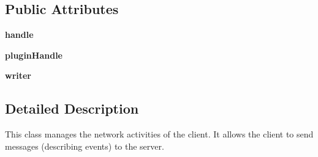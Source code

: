 \subsection*{\-Public \-Attributes}
\begin{DoxyCompactItemize}
\item 
\hypertarget{classshared_1_1network_1_1_network_client_abee0843da70bc52597f451b0844f70c8}{{\bfseries handle}}\label{classshared_1_1network_1_1_network_client_abee0843da70bc52597f451b0844f70c8}

\item 
\hypertarget{classshared_1_1network_1_1_network_client_ab4bb84d37914ba60c1886cedca712655}{{\bfseries plugin\-Handle}}\label{classshared_1_1network_1_1_network_client_ab4bb84d37914ba60c1886cedca712655}

\item 
\hypertarget{classshared_1_1network_1_1_network_client_a642889e1ca4bdd470e4535f7870202e4}{{\bfseries writer}}\label{classshared_1_1network_1_1_network_client_a642889e1ca4bdd470e4535f7870202e4}

\end{DoxyCompactItemize}


\subsection{\-Detailed \-Description}
\begin{DoxyVerb}
This class manages the network activities of the client.
It allows the client to send messages (describing events) to the server.
\end{DoxyVerb}
 

